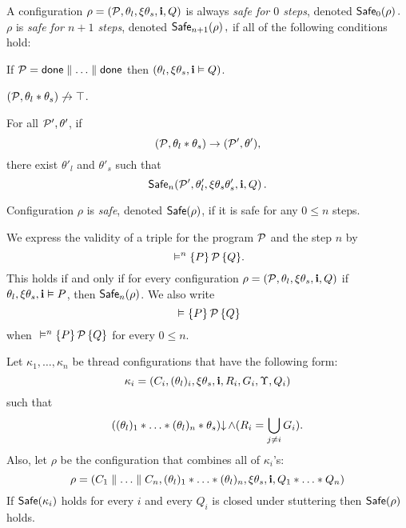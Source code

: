 \begin{defin}\label{def:gsafe}
  A configuration  $\rho = (\mathcal{P},\theta_l,\xi\theta_s,{\bf i},Q)$ is 
  always \emph{safe for $0$ steps}, denoted 
  $
  {\sf Safe}_0(\rho)\,.
  $
  $\rho$ is \emph{safe for $n + 1$ steps},  denoted 
  $
  {\sf Safe}_{n+1}(\rho)\,,
  $
  if 
  all of the following conditions hold:
  \begin{compactenum}[(I)]
    \item \label{gsafe:done} If 
    $\mathcal{P} = {\sf done} \parallel \ldots \parallel {\sf done}$ 
    then $(\theta_l,\xi\theta_s,{\bf i} \vDash Q)$.
    \item \label{gsafe:noabort}  
    $(\mathcal{P},\theta_l*\theta_s) \not\rightarrow \top$.
    \item \label{gsafe:step} 
    For all $\mathcal{P}',\theta'$, if
    $$
    (\mathcal{P},\theta_l*\theta_s) \rightarrow (\mathcal{P}',\theta'),
    $$
    there exist  $\theta'_l$ and $\theta'_s$   such that
    $${\sf Safe}_{n}(\mathcal{P}',\theta'_l,\xi\theta_s\theta'_s,{\bf i},Q)\,.$$ %
  \end{compactenum}
  Configuration $\rho$ is \emph{safe}, denoted ${\sf Safe}(\rho)$, if it is safe for any $0 \leq n$ steps.
\end{defin}

\begin{defin}\label{def:semtriple2}
We express the validity of a triple for the program $\mathcal{P}$ and the step $n$ by
$$
{} \vDash^n \{ P \} \, \mathcal{P} \, \{ Q \}.
$$
This holds if and only if 
for every configuration $\rho = (\mathcal{P},\theta_l,\xi\theta_s,{\bf i},Q)$
if $\theta_l,\xi\theta_s,{\bf i} \vDash P$,
then 
${\sf Safe}_n(\rho)$. We also write
$$
{} \vDash \{ P \} \, \mathcal{P} \, \{ Q \}
$$
when
${} \vDash^n \{ P \} \, \mathcal{P} \, \{ Q \}$ for every $0 \leq n$.
\end{defin}

\begin{lemma}\label{lem:safe:par}
Let $\kappa_1,\ldots,\kappa_n$ be thread configurations that have
the following form:
$$
\kappa_i = (C_i,(\theta_l)_i,\xi\theta_s,{\bf i},R_i,G_i,\Upsilon, Q_i)
$$ 
such that 
$$
((\theta_l)_1 * \ldots * (\theta_l)_n * \theta_s)\mathpunct{\downarrow}
\wedge
(R_i = \bigcup_{j \neq i} G_i).
$$
Also, let $\rho$ be the configuration that combines all of $\kappa_i$'s:
$$
\rho = 
(C_1 \parallel \ldots \parallel C_n,
 (\theta_l)_1 * \ldots * (\theta_l)_n,
 \xi\theta_s,
 {\bf i},Q_1 * \ldots * Q_n)
$$
If ${\sf Safe}(\kappa_i)$ holds for every $i$ and every $Q_i$ is closed under stuttering then
 ${\sf Safe}(\rho)$ holds.
\end{lemma}

